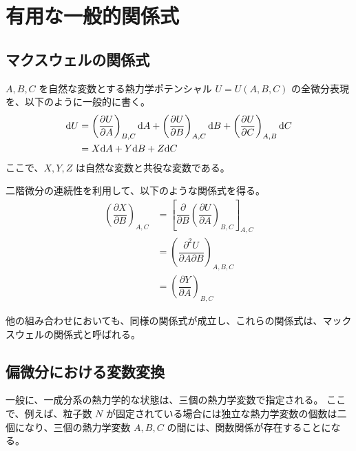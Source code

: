 \documentclass[uplatex,dvipdfmx,a4paper,11pt]{jsarticle}
\newcommand{\diff}{\mathrm d}
\newcommand{\difp}[2]{\dfrac{\partial #1}{\partial #2}}
\begin{document}
\newpage

\section{有用な一般的関係式}

\subsection{マクスウェルの関係式}
$A, B, C$ を自然な変数とする熱力学ポテンシャル $U = U(A, B, C)$ の全微分表現を、以下のように一般的に書く。
\begin{align}
\diff U 	&= \left(\difp {U}{A} \right)_{B, C} \diff A + \left(\difp{U}{B} \right)_{A, C} \diff B + \left(\difp{U}{C} \right)_{A, B} \diff C \notag \\
	&= X \diff A + Y \diff B + Z \diff C
\end{align}
ここで、$X, Y, Z$ は自然な変数と共役な変数である。


二階微分の連続性を利用して、以下のような関係式を得る。
\begin{align*}
\left(\difp{X}{B} \right)_{A, C} 
	&= \left[ \difp{}{B} \left(\difp{U}{A} \right)_{B, C}　\right]_{A, C}　\\
	&= \left( \dfrac{\partial^2 U}{\partial A \partial B} \right)_{A, B, C}\\
	&= \left(\difp{Y}{A} \right)_{B, C} 
\end{align*}

他の組み合わせにおいても、同様の関係式が成立し、これらの関係式は、マックスウェルの関係式と呼ばれる。

\subsection{偏微分における変数変換}
一般に、一成分系の熱力学的な状態は、三個の熱力学変数で指定される。
ここで、例えば、粒子数 $N$ が固定されている場合には独立な熱力学変数の個数は二個になり、三個の熱力学変数 $A, B, C$ の間には、関数関係が存在することになる。
\end{document}
